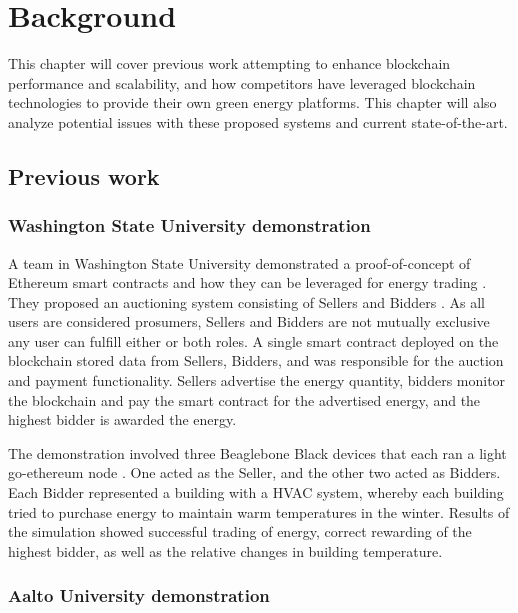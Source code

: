 \chapter{Background}\label{ch:background}


This chapter will cover previous work attempting to enhance blockchain performance and scalability, and how competitors have leveraged blockchain technologies to provide their own green energy platforms. This chapter will also analyze potential issues with these proposed systems and current state-of-the-art.

\section{Previous work}

\subsection{Washington State University demonstration}

A team in Washington State University demonstrated a proof-of-concept of Ethereum smart contracts and how they can be leveraged for energy trading \cite{HSLC17}. They proposed an auctioning system consisting of Sellers and Bidders \cite[p.2]{HSLC17}. As all users are considered prosumers, Sellers and Bidders are not mutually exclusive any user can fulfill either or both roles. A single smart contract deployed on the blockchain stored data from Sellers, Bidders, and was responsible for the auction and payment functionality. Sellers advertise the energy quantity, bidders monitor the blockchain and pay the smart contract for the advertised energy, and the highest bidder is awarded the energy. \cite[p.3]{HSLC17}

The demonstration involved three Beaglebone Black devices that each ran a light go-ethereum node \cite{HSLC17}. One acted as the Seller, and the other two acted as Bidders. Each Bidder represented a building with a HVAC system, whereby each building tried to purchase energy to maintain warm temperatures in the winter. Results of the simulation showed successful trading of energy, correct rewarding of the highest bidder, as well as the relative changes in building temperature.

\subsection{Aalto University demonstration}

